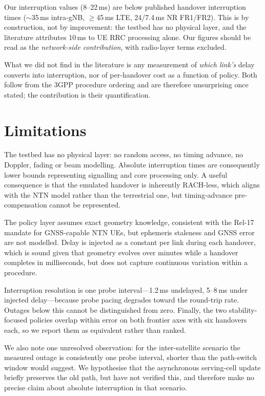 \documentclass[conference]{IEEEtran}
\begin{document}
Our interruption values (8--22\,ms) are below published handover interruption
times (${\sim}$35\,ms intra-gNB, $\geq$45\,ms LTE, 24/7.4\,ms NR FR1/FR2). This
is by construction, not by improvement: the testbed has no physical layer, and
the literature attributes 10\,ms to UE RRC processing alone. Our figures should
be read as the \emph{network-side contribution}, with radio-layer terms excluded.

What we did not find in the literature is any measurement of \emph{which link's}
delay converts into interruption, nor of per-handover cost as a function of
policy. Both follow from the 3GPP procedure ordering and are therefore
unsurprising once stated; the contribution is their quantification.

\section{Limitations}

The testbed has no physical layer: no random access, no timing advance, no
Doppler, fading or beam modelling. Absolute interruption times are consequently
lower bounds representing signalling and core processing only. A useful
consequence is that the emulated handover is inherently RACH-less, which aligns
with the NTN model rather than the terrestrial one, but timing-advance
pre-compensation cannot be represented.

The policy layer assumes exact geometry knowledge, consistent with the Rel-17
mandate for GNSS-capable NTN UEs, but ephemeris staleness and GNSS error are not
modelled. Delay is injected as a constant per link during each handover, which
is sound given that geometry evolves over minutes while a handover completes in
milliseconds, but does not capture continuous variation within a procedure.

Interruption resolution is one probe interval---1.2\,ms undelayed, 5--8\,ms
under injected delay---because probe pacing degrades toward the round-trip rate.
Outages below this cannot be distinguished from zero. Finally, the two
stability-focused policies overlap within error on both frontier axes with six
handovers each, so we report them as equivalent rather than ranked.

We also note one unresolved observation: for the inter-satellite scenario the
measured outage is consistently one probe interval, shorter than the path-switch
window would suggest. We hypothesise that the asynchronous serving-cell update
briefly preserves the old path, but have not verified this, and therefore make
no precise claim about absolute interruption in that scenario.
\end{document}
